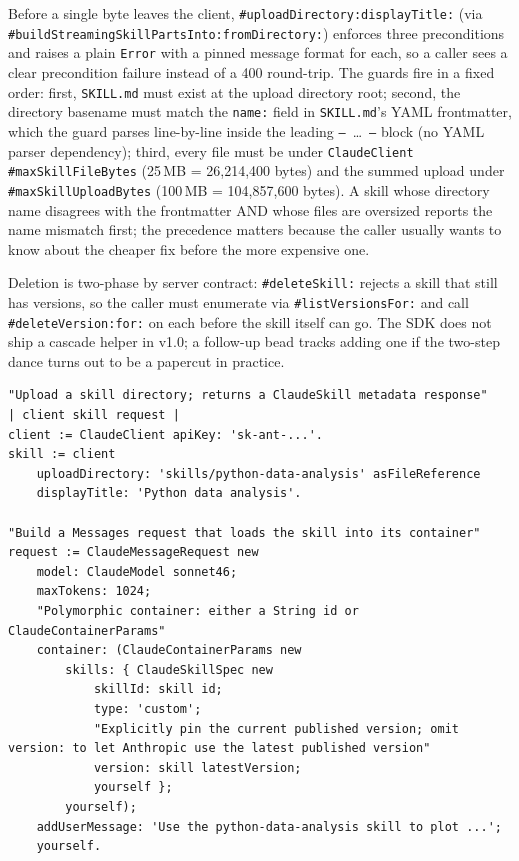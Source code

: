 \documentclass[a4paper,10pt,fleqn]{article}
\newcommand{\cls}[1]{\texttt{#1}}
\newcommand{\sel}[1]{\texttt{\##1}}
\begin{document}
\begin{sloppypar}
Before a single byte leaves the client,
\sel{uploadDirectory:displayTitle:} (via
\sel{buildStreamingSkillPartsInto:fromDirectory:}) enforces three
preconditions and raises a plain \cls{Error} with a pinned
message format for each, so a caller sees a clear precondition
failure instead of a 400 round-trip.  The guards fire in a fixed
order: first, \texttt{SKILL.md} must exist at the upload directory
root; second, the directory basename must match the \texttt{name:}
field in \texttt{SKILL.md}'s YAML frontmatter, which the guard
parses line-by-line inside the leading \texttt{---}~\ldots~\texttt{---}
block (no YAML parser dependency); third, every file must be under
\cls{ClaudeClient} \sel{maxSkillFileBytes} (25\,MB = 26,214,400
bytes) and the summed upload under \sel{maxSkillUploadBytes}
(100\,MB = 104,857,600 bytes).  A skill whose directory name
disagrees with the frontmatter AND whose files are oversized
reports the name mismatch first; the precedence matters because
the caller usually wants to know about the cheaper fix before the
more expensive one.
\end{sloppypar}

Deletion is two-phase by server contract: \sel{deleteSkill:}
rejects a skill that still has versions, so the caller must
enumerate via \sel{listVersionsFor:} and call \sel{deleteVersion:for:}
on each before the skill itself can go.  The SDK does not ship a
cascade helper in v1.0; a follow-up bead tracks adding one if the
two-step dance turns out to be a papercut in practice.

\begin{lstlisting}[language={},title={Skills API}]
"Upload a skill directory; returns a ClaudeSkill metadata response"
| client skill request |
client := ClaudeClient apiKey: 'sk-ant-...'.
skill := client
    uploadDirectory: 'skills/python-data-analysis' asFileReference
    displayTitle: 'Python data analysis'.

"Build a Messages request that loads the skill into its container"
request := ClaudeMessageRequest new
    model: ClaudeModel sonnet46;
    maxTokens: 1024;
    "Polymorphic container: either a String id or ClaudeContainerParams"
    container: (ClaudeContainerParams new
        skills: { ClaudeSkillSpec new
            skillId: skill id;
            type: 'custom';
            "Explicitly pin the current published version; omit version: to let Anthropic use the latest published version"
            version: skill latestVersion;
            yourself };
        yourself);
    addUserMessage: 'Use the python-data-analysis skill to plot ...';
    yourself.
\end{lstlisting}
\end{document}
